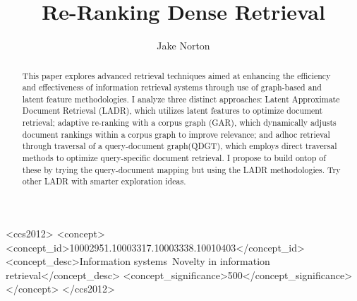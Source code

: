 \documentclass[sigconf,authorversion,nonacm]{acmart}
\begin{document}
\title{Re-Ranking Dense Retrieval}
\author{Jake Norton}



\begin{abstract}

	This paper explores advanced retrieval techniques aimed at enhancing the efficiency
	and effectiveness of information retrieval systems through use of graph-based and
	latent feature methodologies. I analyze three distinct approaches: Latent Approximate Document
	Retrieval (LADR)\cite{ladr}, which utilizes latent features to optimize document retrieval; adaptive
	re-ranking with a corpus graph (GAR)\cite{gar}, which dynamically adjusts document rankings within a
	corpus graph to improve relevance; and adhoc retrieval through traversal of a query-document
	graph(QDGT)\cite{query-document}, which employs direct traversal methods to optimize query-specific document retrieval. I
	propose to build ontop of these by trying the query-document mapping but using the LADR
	methodologies. Try other LADR with smarter exploration ideas.


\end{abstract}


\begin{CCSXML} <ccs2012> <concept> <concept_id>10002951.10003317.10003338.10010403</concept_id>
	<concept_desc>Information systems~Novelty in information retrieval</concept_desc>
	<concept_significance>500</concept_significance> </concept> </ccs2012>
\end{CCSXML}


\maketitle
\end{document}
